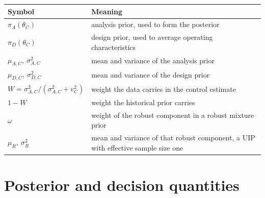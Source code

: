 \begin{tabularx}{\linewidth}{@{}lX@{}}
\toprule
Symbol & Meaning \\
\midrule
$\pi_A(\theta_C)$                       & analysis prior, used to form the posterior \\
$\pi_D(\theta_C)$                       & design prior, used to average operating characteristics \\
$\mu_{A,C},\ \sigma_{A,C}^2$            & mean and variance of the analysis prior \\
$\mu_{D,C},\ \sigma_{D,C}^2$            & mean and variance of the design prior \\
$W = \sigma_{A,C}^2/(\sigma_{A,C}^2+v_C^2)$ & weight the data carries in the control estimate \\
$1-W$                                   & weight the historical prior carries \\
$\omega$                                & weight of the robust component in a robust mixture prior \\
$\mu_R,\ \sigma_R^2$                    & mean and variance of that robust component, a UIP with effective sample size one \\
\bottomrule
\end{tabularx}

\section*{Posterior and decision quantities}

